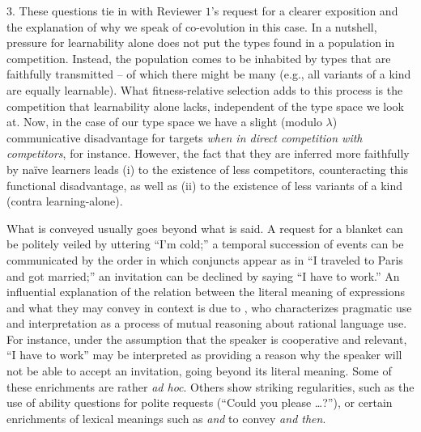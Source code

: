 \documentclass[a4paper, 11pt]{article}
\theoremstyle{Satz}
\newcommand{\hl}[1]{\textcolor[rgb]{.8,.33,.0}{#1}}%
\begin{document}
\hl{3. These questions tie in with Reviewer $1$'s request for a clearer exposition and the explanation of why we speak of co-evolution in this case. In a nutshell, pressure for learnability alone does not put the types found in a population in competition. Instead, the population comes to be inhabited by types that are faithfully transmitted -- of which there might be many (e.g., all variants of a kind are equally learnable). What fitness-relative selection adds to this process is the competition that learnability alone lacks, independent of the type space we look at. Now, in the case of our type space we have a slight (modulo $\lambda$) communicative disadvantage for targets  {\em when in direct competition with competitors}, for instance. However, the fact that they are inferred more faithfully by na\"ive learners leads (i) to the existence of less competitors, counteracting this functional disadvantage, as well as (ii) to the existence of less variants of a kind (contra learning-alone).}


What is conveyed usually goes beyond what is said. A request for a blanket can be politely
veiled by uttering ``I'm cold;'' a temporal succession of events can be communicated by the order
in which conjuncts appear as in ``I traveled to Paris and got married;'' an invitation can be
declined by saying ``I have to work.'' An influential explanation of the relation between the
literal meaning of expressions and what they may convey in context is due to
\citet{grice:1975}, who characterizes pragmatic use and interpretation as a process of mutual
reasoning about rational language use. For instance, under the assumption that the speaker is
cooperative and relevant, ``I have to work'' may be interpreted as providing a reason why the
speaker will not be able to accept an invitation, going beyond its literal meaning. Some of
these enrichments are rather \emph{ad hoc}. Others show striking regularities, such as the use
of ability questions for polite requests (``Could you please \dots?''), or certain enrichments
of lexical meanings such as \emph{and} to convey \emph{and then}.
\end{document}

